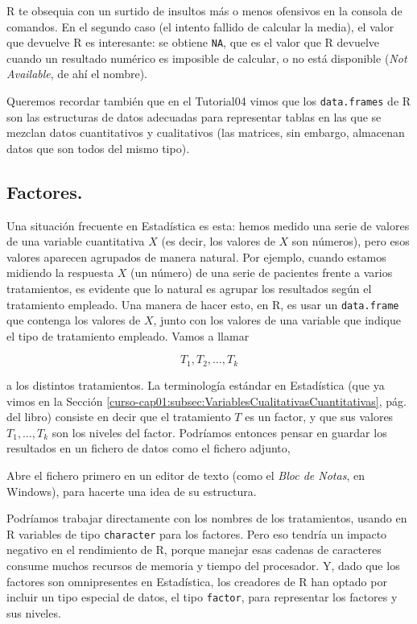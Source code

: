 \documentclass[10pt,a4paper]{article}\usepackage[]{graphicx}\usepackage[]{color}
\newcounter {cont01}
\begin{document}
R te obsequia con un surtido de insultos más o menos ofensivos en la consola de comandos. En el segundo caso (el intento fallido de calcular la media), el valor que devuelve R es interesante: se obtiene {\tt NA}, que es el valor que R devuelve cuando un resultado numérico es imposible de calcular, o no está disponible ({\em Not Available}, de ahí el nombre).

Queremos recordar también que en el Tutorial04 vimos que los {\tt data.frames} de R son las estructuras de datos adecuadas para representar tablas en las que se mezclan datos cuantitativos y cualitativos (las matrices, sin embargo, almacenan datos que son todos del mismo tipo).

\subsection{Factores.}

Una situación frecuente en Estadística es esta: hemos medido una serie de valores de una variable cuantitativa $X$ (es decir, los valores de $X$ son números), pero esos valores aparecen agrupados de manera natural. Por ejemplo, cuando estamos midiendo la respuesta $X$ (un número) de una serie de pacientes frente a varios tratamientos, es evidente que lo natural es agrupar los resultados según el tratamiento empleado. Una manera de hacer esto, en R, es usar un {\tt data.frame} que contenga los valores de $X$, junto con los valores de una variable que indique el tipo de tratamiento empleado. Vamos a llamar

\[T_1, T_2, \ldots, T_k\]

a los distintos tratamientos. La terminología estándar en Estadística (que ya vimos en la Sección \ref{curso-cap01:subsec:VariablesCualitativasCuantitativas}, pág. \pageref{curso-cap01:subsec:VariablesCualitativasCuantitativas} del libro) consiste en decir que el tratamiento $T$ es un {\sf factor}, y que sus valores $T_1,\ldots,T_k$ son los {\sf niveles} del factor. Podríamos entonces pensar en guardar los resultados en un fichero de datos como el fichero adjunto,
\begin{center}
\end{center}
Abre el fichero primero en un editor de texto (como el {\em Bloc de Notas}, en Windows), para hacerte una idea de su estructura.

Podríamos trabajar directamente con los nombres de los tratamientos, usando en R variables de tipo {\tt character} para los factores. Pero eso tendría un impacto negativo en el rendimiento de R, porque manejar esas cadenas de caracteres consume muchos recursos de memoria y tiempo del procesador. Y, dado que los factores son omnipresentes en Estadística, los creadores de R han optado por incluir un tipo especial de datos, el tipo {\tt factor}, para representar los factores y sus niveles.
\end{document}
